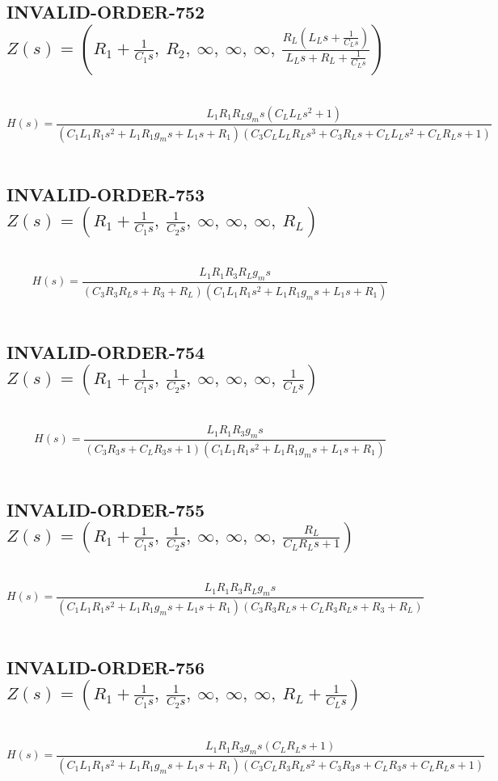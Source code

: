\documentclass{article}
\begin{document}
\subsection{INVALID-ORDER-752 $Z(s) = \left( R_{1} + \frac{1}{C_{1} s}, \  R_{2}, \  \infty, \  \infty, \  \infty, \  \frac{R_{L} \left(L_{L} s + \frac{1}{C_{L} s}\right)}{L_{L} s + R_{L} + \frac{1}{C_{L} s}}\right)$ } \ 
\textbf{\[H(s) = \frac{L_{1} R_{1} R_{L} g_{m} s \left(C_{L} L_{L} s^{2} + 1\right)}{\left(C_{1} L_{1} R_{1} s^{2} + L_{1} R_{1} g_{m} s + L_{1} s + R_{1}\right) \left(C_{3} C_{L} L_{L} R_{L} s^{3} + C_{3} R_{L} s + C_{L} L_{L} s^{2} + C_{L} R_{L} s + 1\right)}\] } \ 
\subsection{INVALID-ORDER-753 $Z(s) = \left( R_{1} + \frac{1}{C_{1} s}, \  \frac{1}{C_{2} s}, \  \infty, \  \infty, \  \infty, \  R_{L}\right)$ } \ 
\textbf{\[H(s) = \frac{L_{1} R_{1} R_{3} R_{L} g_{m} s}{\left(C_{3} R_{3} R_{L} s + R_{3} + R_{L}\right) \left(C_{1} L_{1} R_{1} s^{2} + L_{1} R_{1} g_{m} s + L_{1} s + R_{1}\right)}\] } \ 
\subsection{INVALID-ORDER-754 $Z(s) = \left( R_{1} + \frac{1}{C_{1} s}, \  \frac{1}{C_{2} s}, \  \infty, \  \infty, \  \infty, \  \frac{1}{C_{L} s}\right)$ } \ 
\textbf{\[H(s) = \frac{L_{1} R_{1} R_{3} g_{m} s}{\left(C_{3} R_{3} s + C_{L} R_{3} s + 1\right) \left(C_{1} L_{1} R_{1} s^{2} + L_{1} R_{1} g_{m} s + L_{1} s + R_{1}\right)}\] } \ 
\subsection{INVALID-ORDER-755 $Z(s) = \left( R_{1} + \frac{1}{C_{1} s}, \  \frac{1}{C_{2} s}, \  \infty, \  \infty, \  \infty, \  \frac{R_{L}}{C_{L} R_{L} s + 1}\right)$ } \ 
\textbf{\[H(s) = \frac{L_{1} R_{1} R_{3} R_{L} g_{m} s}{\left(C_{1} L_{1} R_{1} s^{2} + L_{1} R_{1} g_{m} s + L_{1} s + R_{1}\right) \left(C_{3} R_{3} R_{L} s + C_{L} R_{3} R_{L} s + R_{3} + R_{L}\right)}\] } \ 
\subsection{INVALID-ORDER-756 $Z(s) = \left( R_{1} + \frac{1}{C_{1} s}, \  \frac{1}{C_{2} s}, \  \infty, \  \infty, \  \infty, \  R_{L} + \frac{1}{C_{L} s}\right)$ } \ 
\textbf{\[H(s) = \frac{L_{1} R_{1} R_{3} g_{m} s \left(C_{L} R_{L} s + 1\right)}{\left(C_{1} L_{1} R_{1} s^{2} + L_{1} R_{1} g_{m} s + L_{1} s + R_{1}\right) \left(C_{3} C_{L} R_{3} R_{L} s^{2} + C_{3} R_{3} s + C_{L} R_{3} s + C_{L} R_{L} s + 1\right)}\] } \ 
\end{document}
